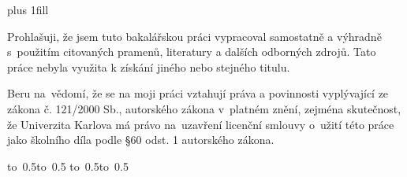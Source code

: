 \newpage

\openright
\hypersetup{pageanchor=true}
\pagestyle{plain}
\vglue 0pt plus 1fill

\noindent
Prohlašuji, že jsem tuto bakalářskou práci vypracoval samostatně a výhradně
s~použitím citovaných pramenů, literatury a dalších odborných zdrojů.
Tato práce nebyla využita k získání jiného nebo stejného titulu.
%

Beru na~vědomí, že se na moji práci vztahují práva a povinnosti vyplývající
ze zákona č. 121/2000 Sb., autorského zákona v~platném znění, zejména skutečnost,
že Univerzita Karlova má právo na~uzavření licenční smlouvy o~užití této
práce jako školního díla podle §60 odst. 1 autorského zákona.

\vspace{10mm}


\hbox{\hbox to 0.5\hbox to 0.5\hsize{\dotfill\quad}}
\smallskip
\hbox{\hbox to 0.5\hsize{}\hbox to 0.5}

\vspace{20mm}
\newpage


\openright

\noindent
\Dedication

\newpage


\openright

